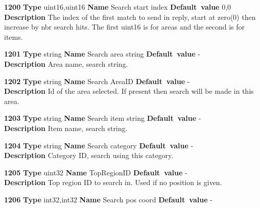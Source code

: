 \documentclass[a4paper]{article}
\begin{document}
\begin{list}{\textbf{ParamID}}{}
\item \textbf{1200} \textbf{Type} uint16,uint16 
                 \textbf{Name} Search start index
                 \textbf{Default~value} 0,0 \\
  \label{Search start index}
  \textbf{Description} The index of the first match to send in
  reply, start at zero(0) then increase by nbr search hits. The first uint16
  is for areas and the second is for items.
\item \textbf{1201} \textbf{Type} string \textbf{Name} Search area string
                 \textbf{Default~value} - \\
  \label{Search area string}
  \textbf{Description} Area name, search string.
\item \textbf{1202} \textbf{Type} string \textbf{Name} Search AreaID
                 \textbf{Default~value} - \\
  \label{Search AreaID}
  \textbf{Description} Id of the area selected. If present then search will be 
  made in this area.
\item \textbf{1203} \textbf{Type} string \textbf{Name} Search item string
                 \textbf{Default~value} - \\
  \label{Search item string}
  \textbf{Description} Item name, search string.
\item \textbf{1204} \textbf{Type} string \textbf{Name} Search category
                 \textbf{Default~value} - \\
  \label{Search category}
  \textbf{Description} Category ID, search using this category.
\item \textbf{1205} \textbf{Type} uint32 \textbf{Name} TopRegionID
                 \textbf{Default~value} - \\
  \label{search_req:TopRegionID}
  \textbf{Description} Top region ID to search in. Used if no position is 
  given.
\item \textbf{1206} \textbf{Type} int32,int32 \textbf{Name} Search pos coord
                 \textbf{Default~value} - \\

\end{list}
\end{document}
